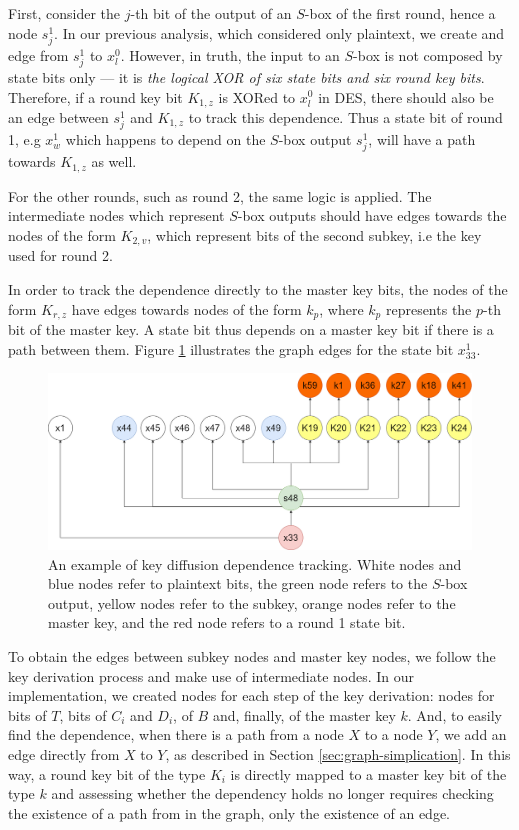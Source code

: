 \documentclass{report}
\begin{document}
First, consider the $j$-th bit of the output of an $S$-box of the first round, hence a node $s^1_j$. In our previous analysis, which considered only plaintext, we create and edge from $s^1_j$ to $x^0_l$. However, in truth, the input to an $S$-box is not composed by state bits only --- it is \emph{the logical XOR of six state bits and six round key bits}. Therefore, if a round key bit $K_{1,z}$ is XORed to $x^0_l$ in DES, there should also be an edge between $s^1_j$ and $K_{1,z}$ to track this dependence. Thus a state bit of round 1, e.g $x^1_w$ which happens to depend on the $S$-box output $s^1_j$, will have a path towards $K_{1,z}$ as well.

For the other rounds, such as round 2, the same logic is applied. The intermediate nodes which represent $S$-box outputs should have edges towards the nodes of the form $K_{2,v}$, which represent bits of the second subkey, i.e the key used for round 2.

In order to track the dependence directly to the master key bits, the nodes of the form $K_{r,z}$ have edges towards nodes of the form $k_p$, where $k_p$ represents the $p$-th bit of the master key. A state bit thus depends on a master key bit if there is a path between them. Figure \ref{fig:keydiff} illustrates the graph edges for the state bit $x^1_{33}$. 

\begin{figure}[H]
    \centering
    \includegraphics[scale=0.25]{figura_key_diffusion.png}
    \caption{An example of key diffusion dependence tracking. White nodes and blue nodes refer to plaintext bits, the green node refers to the $S$-box output, yellow nodes refer to the subkey, orange nodes refer to the master key, and the red node refers to a round 1 state bit.}
    \label{fig:keydiff}
\end{figure}

To obtain the edges between subkey nodes and master key nodes, we follow the key derivation process and make use of intermediate nodes. In our implementation, we created nodes for each step of the key derivation: nodes for bits of $T$, bits of $C_i$ and $D_i$, of $B$ and, finally, of the master key $k$. And, to easily find the dependence, when there is a path from a node $X$ to a node $Y$, we add an edge directly from $X$ to $Y$, as described in Section \ref{sec:graph-simplication}. In this way, a round key bit of the type $K_i$ is directly mapped to a master key bit of the type $k$ and assessing whether the dependency holds no longer requires checking the existence of a path from in the graph, only the existence of an edge.
\end{document}
